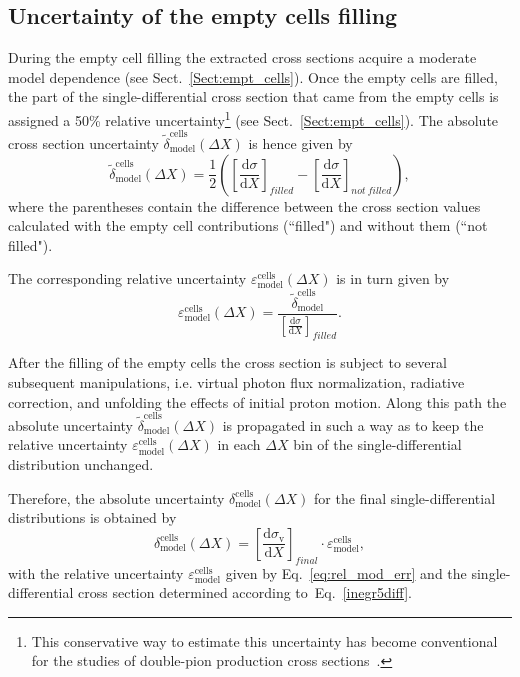 \subsection{Uncertainty of the empty cells filling}

During the empty cell filling the extracted cross sections acquire a moderate model dependence (see Sect.~\ref{Sect:empt_cells}). Once the empty cells are filled, the part of the single-differential cross section that came from the empty cells is assigned a 50\% relative uncertainty\footnote[2]{This conservative way to estimate this uncertainty has become conventional for the studies of double-pion production cross sections~\cite{Isupov:2017lnd,Fed_an_note:2017,Golovach}. } (see Sect.~\ref{Sect:empt_cells}). The absolute cross section uncertainty $\widetilde{\delta}^{\text{cells}}_{\text{model}}(\Delta X)$ is hence given by\vspace{-0.5em}
\begin{equation}
\widetilde{\delta}^{\text{cells}}_{\text{model}} (\Delta X) = \frac{1}{2}\left ( \left [ \frac{\textrm{d}\sigma}{\textrm{d}X} \right ]_{filled} - \left [\frac{\textrm{d}\sigma}{\textrm{d}X} \right ]_{not~filled} \right ),
\label{eq:error_mod_abs_tmp}
\end{equation}
where the parentheses contain the difference between the cross section values calculated with the empty cell contributions (``filled") and without them (``not filled").


The corresponding relative uncertainty $\varepsilon^{\text{cells}}_{\text{model}} (\Delta X)$ is in turn given by \vspace{-0.5em}
\begin{equation}
\varepsilon^{\text{cells}}_{\text{model}} (\Delta X) = \dfrac{\widetilde{\delta}^{\text{cells}}_{\text{model}}}{\left [ \frac{\textrm{d}\sigma}{\textrm{d}X} \right ]_{filled}}.
\label{eq:rel_mod_err}
\end{equation}

After the filling of the empty cells the cross section is subject to several subsequent manipulations, i.e. virtual photon flux normalization, radiative correction, and unfolding the effects of initial proton motion. Along this path the absolute uncertainty $\widetilde{\delta}^{\text{cells}}_{\text{model}} (\Delta X)$ is propagated in such a way as to keep the relative uncertainty $\varepsilon^{\text{cells}}_{\text{model}}(\Delta X)$ in each $\Delta X$ bin of the single-differential distribution unchanged.

Therefore, the absolute uncertainty $\delta^{\text{cells}}_{\text{model}} (\Delta X)$ for the final single-differential distributions is obtained by\vspace{-0.5em}
\begin{equation}
\delta^{\text{cells}}_{\text{model}} (\Delta X) = \left [ \frac{\textrm{d}\sigma_{\text{v}}}{\textrm{d}X} \right ]_{final}\!\! \cdot \varepsilon^{\text{cells}}_{\text{model}},
\label{eq:error_mod_abs}
\end{equation}
with the relative uncertainty $\varepsilon^{\text{cells}}_{\text{model}}$ given by Eq.~\eqref{eq:rel_mod_err} and the single-differential cross section determined according to~Eq.~\eqref{inegr5diff}.


